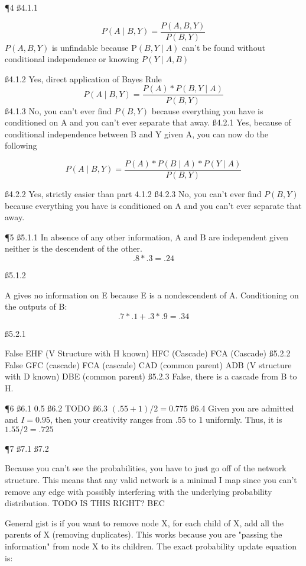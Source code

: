 \P 4
\ss{4.1.1}

\[
 P(A \mid B,Y) = \frac{P(A,B,Y)}{ P(B,Y)}	
\]
$P(A,B,Y)$ is unfindable because P$(B,Y \mid A)$ can't be found without conditional independence or knowing $P(Y \mid A,B)$

\ss{4.1.2}
Yes, direct application of Bayes Rule
\[
P (A \mid B,Y) = \frac{P(A) * P(B,Y \mid A) } {P(B,Y)}
\]
\ss{4.1.3}
No, you can't ever find $P(B,Y)$ because everything you have is conditioned on A and you can't ever separate that away.
\ss{4.2.1}
Yes, because of conditional independence between B and Y given A, you can now do the following

\[
P (A \mid B,Y) = \frac{P(A) * P(B \mid A) * P(Y \mid A) } {P(B,Y)}
\]

\ss{4.2.2}
Yes, strictly easier than part 4.1.2
\ss{4.2.3}
No, you can't ever find $P(B,Y)$ because everything you have is conditioned on A and you can't ever separate that away.

\P 5
\ss{5.1.1}
In absence of any other information, A and B are independent given neither is the descendent of the other.
\[.8*.3 = .24\]

\ss{5.1.2}

A gives no information on E because E is a nondescendent of A. \newline \newline Conditioning on the outputs of B:
\[.7*.1 + .3*.9 = .34\]

\ss{5.2.1}

False
EHF (V Structure with H known)
HFC (Cascade)
FCA (Cascade)
\ss{5.2.2}
False
GFC (cascade)
FCA (cascade)
CAD (common parent)
ADB (V structure with D known)
DBE (common parent)
\ss{5.2.3}
False, there is a cascade from 	B to H.

\P 6
\ss{6.1}
0.5
\ss{6.2}
TODO
\ss{6.3}
$(.55+1)/2 = 0.775$
\ss{6.4}
Given you are admitted and $I = 0.95$, then your creativity ranges from .55 to 1 uniformly. Thus, it is $1.55/2 = .725$

\P 7
\ss{7.1}
\ss{7.2}



Because you can't see the probabilities, you have to just go off of the network structure. This means that any valid network is a minimal I map since you can't remove any edge with possibly interfering with the underlying probability distribution. TODO IS THIS RIGHT? BEC

General gist is if you want to remove node X, for each child of X, add all the parents of X (removing duplicates). This works because you are "passing the information" from node X to its children. The exact probability update equation is:

